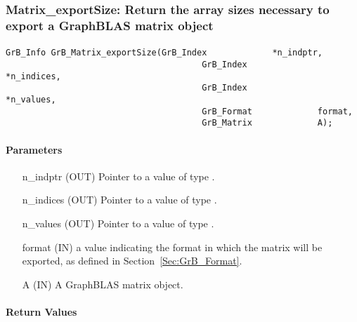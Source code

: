 
\subsubsection{{\sf Matrix\_exportSize}: Return the array sizes necessary to export a GraphBLAS matrix object }
\label{Sec:Matrix_exportSize}

\paragraph{\syntax}

\begin{Verbatim}[samepage=true]    
        GrB_Info GrB_Matrix_exportSize(GrB_Index             *n_indptr,
                                       GrB_Index             *n_indices,
                                       GrB_Index             *n_values,
                                       GrB_Format             format,
                                       GrB_Matrix             A);
\end{Verbatim}

\paragraph{Parameters}

\begin{itemize}[leftmargin=1.1in]
    \item[{\sf n\_indptr}]  ({\sf OUT}) Pointer to a value of type .
    \item[{\sf n\_indices}] ({\sf OUT}) Pointer to a value of type .
    \item[{\sf n\_values}]  ({\sf OUT}) Pointer to a value of type .
    \item[{\sf format}] ({\sf IN}) a value indicating the format in which the matrix
    will be exported, as defined in Section~\ref{Sec:GrB_Format}.
    \item[{\sf A}]      ({\sf IN}) A GraphBLAS matrix object.
\end{itemize}

\paragraph{Return Values}

